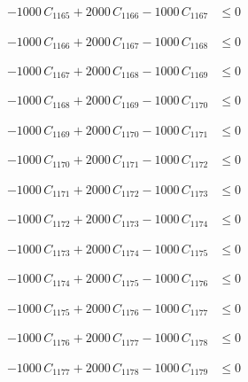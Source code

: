 \documentclass[a4paper,11pt]{article}
\begin{document}
\begin{align}
-1000\,C_{1165} + 2000\,C_{1166} - 1000\,C_{1167} &\leq 0 \nonumber
\end{align}

\begin{align}
-1000\,C_{1166} + 2000\,C_{1167} - 1000\,C_{1168} &\leq 0 \nonumber
\end{align}

\begin{align}
-1000\,C_{1167} + 2000\,C_{1168} - 1000\,C_{1169} &\leq 0 \nonumber
\end{align}

\begin{align}
-1000\,C_{1168} + 2000\,C_{1169} - 1000\,C_{1170} &\leq 0 \nonumber
\end{align}

\begin{align}
-1000\,C_{1169} + 2000\,C_{1170} - 1000\,C_{1171} &\leq 0 \nonumber
\end{align}

\begin{align}
-1000\,C_{1170} + 2000\,C_{1171} - 1000\,C_{1172} &\leq 0 \nonumber
\end{align}

\begin{align}
-1000\,C_{1171} + 2000\,C_{1172} - 1000\,C_{1173} &\leq 0 \nonumber
\end{align}

\begin{align}
-1000\,C_{1172} + 2000\,C_{1173} - 1000\,C_{1174} &\leq 0 \nonumber
\end{align}

\begin{align}
-1000\,C_{1173} + 2000\,C_{1174} - 1000\,C_{1175} &\leq 0 \nonumber
\end{align}

\begin{align}
-1000\,C_{1174} + 2000\,C_{1175} - 1000\,C_{1176} &\leq 0 \nonumber
\end{align}

\begin{align}
-1000\,C_{1175} + 2000\,C_{1176} - 1000\,C_{1177} &\leq 0 \nonumber
\end{align}

\begin{align}
-1000\,C_{1176} + 2000\,C_{1177} - 1000\,C_{1178} &\leq 0 \nonumber
\end{align}

\begin{align}
-1000\,C_{1177} + 2000\,C_{1178} - 1000\,C_{1179} &\leq 0 \nonumber
\end{align}
\end{document}
